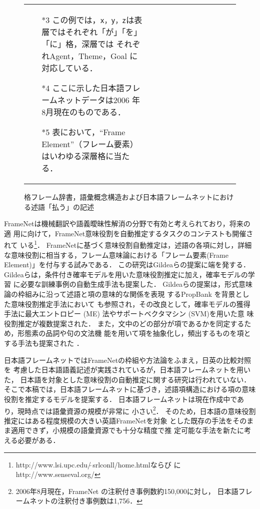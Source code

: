 \documentclass[japanese]{jnlp_1.2b}
\begin{document}
\begin{figure}[p]
\begin{tabular}{llllllllllll}
{\begin{minipage}[t]{0.8\textwidth}
\begin{itemize}
			    から引用した．
     \item[\hspace*{3mm}*3] この例では，\texttt{x，y，z}は表
			    層ではそれぞれ「が」「を」「に」格，深層では
			    それぞれAgent，Theme，Goal に対応している．
     \item[\hspace*{3mm}*4] ここに示した日本語フレームネットデータは2006
			    年8月現在のものである．
      \item[\hspace*{3mm}*5] 表において，``Frame Element''（フレーム要素）
			    はいわゆる深層格に当たる．
    \end{itemize}
   \end{minipage}}\\
  \end{tabular}
    \vspace{4pt}
  \caption{格フレーム辞書，語彙概念構造および日本語フレームネットにおけ
  る述語「払う」の記述}
  \label{fig:resource_comparison}
\end{figure}

FrameNetは機械翻訳や語義曖昧性解消の分野で有効と考えられており，将来の適
用に向けて，FrameNet意味役割を自動推定するタスクのコンテストも開催されて
いる\footnote{http://www.lsi.upc.edu/$\tilde{~}$srlconll/home.htmlならび
にhttp://www.senseval.org/}\cite{litkowski04}．
FrameNetに基づく意味役割自動推定は，述語の各項に対し，詳細な意味役割に相当する，フレーム意味論における「フレーム要素(Frame Element)」を付与する試みである．
この研究はGildeaらの提案に端を発する\cite{gildea02}．
Gildeaらは，条件付き確率モデルを用いた意味役割推定に加え，確率モデルの学習
に必要な訓練事例の自動生成手法も提案した．
Gildeaらの提案は，形式意味論の枠組みに沿って述語と項の意味的な関係を表現
するPropBank \cite[など]{kingsbury02}を背景とした意味役割推定手法において
も参照され，その改良として，確率モデルの獲得手法に最大エントロピー (ME)
法\cite{berger96}やサポートベクタマシン (SVM)\cite{vapnik99}を用いた意
味役割推定が複数提案された\cite[など]{kwon04,pradhan04,bejan04}．
また，文中のどの部分が項であるかを同定するため，形態素の品詞や句の文法機
能を用いて項を抽象化し，頻出するものを項とする手法も提案された
\cite{baldewein04}．


日本語フレームネットではFrameNetの枠組や方法論をふまえ，日英の比較対照を
考慮した日本語語義記述が実践されているが，日本語フレームネットを用いた，
日本語を対象とした意味役割の自動推定に関する研究は行われていない．
そこで本稿では，日本語フレームネットに基づき，述語項構造における項の意味
役割を推定するモデルを提案する．
日本語フレームネットは現在作成中であり，現時点では語彙資源の規模が非常に
小さい\footnote{2006年8月現在，FrameNet の注釈付き事例数約150,000に対し，
日本語フレームネットの注釈付き事例数は1,756．}．
そのため，日本語の意味役割推定にはある程度規模の大きい英語FrameNetを対象
とした既存の手法をそのまま適用できず，小規模の語彙資源でも十分な精度で推
定可能な手法を新たに考える必要がある．
\end{document}
